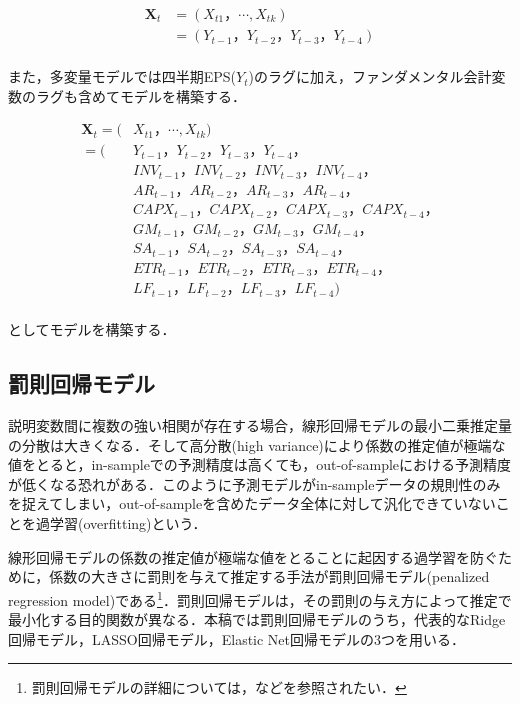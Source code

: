 \documentclass[a4paper，12pt]{jsarticle}
\begin{document}
\begin{equation}
  \begin{split}
    \bm{X}_t &= (X_{t1}，\cdots ,X_{tk}) \\
    &= (Y_{t-1}，Y_{t-2}，Y_{t-3}，Y_{t-4}) \\
  \end{split}
\end{equation}

また，多変量モデルでは四半期EPS($Y_t$)のラグに加え，ファンダメンタル会計変数のラグも含めてモデルを構築する．

\begin{equation}
  \begin{split}
    \bm{X}_t = (&X_{t1}，\cdots ,X_{tk}) \\ 
    =(&Y_{t-1}，Y_{t-2}，Y_{t-3}，Y_{t-4}，\\
    & INV_{t-1}，INV_{t-2}，INV_{t-3}，INV_{t-4}，\\
    & AR_{t-1}，AR_{t-2}，AR_{t-3}，AR_{t-4}，\\
    & CAPX_{t-1}，CAPX_{t-2}，CAPX_{t-3}，CAPX_{t-4}，\\
    & GM_{t-1}，GM_{t-2}，GM_{t-3}，GM_{t-4}，\\
    & SA_{t-1}，SA_{t-2}，SA_{t-3}，SA_{t-4}，\\
    & ETR_{t-1}，ETR_{t-2}，ETR_{t-3}，ETR_{t-4}，\\ 
    & LF_{t-1}，LF_{t-2}，LF_{t-3}，LF_{t-4}) \\
  \end{split}
\end{equation}

としてモデルを構築する．

\subsection{罰則回帰モデル}

説明変数間に複数の強い相関が存在する場合，線形回帰モデルの最小二乗推定量の分散は大きくなる．そして高分散(high variance)により係数の推定値が極端な値をとると，in-sampleでの予測精度は高くても，out-of-sampleにおける予測精度が低くなる恐れがある．このように予測モデルがin-sampleデータの規則性のみを捉えてしまい，out-of-sampleを含めたデータ全体に対して汎化できていないことを過学習(overfitting)という．

線形回帰モデルの係数の推定値が極端な値をとることに起因する過学習を防ぐために，係数の大きさに罰則を与えて推定する手法が罰則回帰モデル(penalized regression model)である\footnote{罰則回帰モデルの詳細については，\cite*{hoerl1970ridge, tibshirani1996regression, zou2005regularization}などを参照されたい．}．罰則回帰モデルは，その罰則の与え方によって推定で最小化する目的関数が異なる．本稿では罰則回帰モデルのうち，代表的なRidge回帰モデル，LASSO回帰モデル，Elastic Net回帰モデルの3つを用いる．
\end{document}
